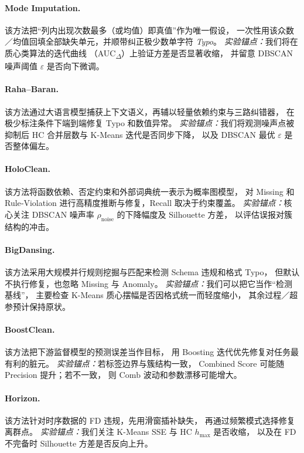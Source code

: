 \documentclass[10pt]{article} %
\numberwithin{equation}{section}
\begin{document}
\paragraph{Mode Imputation.}
该方法把“列内出现次数最多（或均值）即真值”作为唯一假设，  
一次性用该众数／均值回填全部缺失单元，并顺带纠正极少数单字符 \textit{Typo}。  
\emph{实验锚点：}我们将在质心类算法的迭代曲线
（AUC\textsubscript{$\Delta$}）上验证方差是否显著收缩，
并留意 DBSCAN 噪声阈值 $\varepsilon$ 是否向下微调。

\paragraph{Raha--Baran\cite{10.14778/3407790.3407801}.}
该方法通过大语言模型捕获上下文语义，再辅以轻量依赖约束与三路纠错器，
在极少标注条件下端到端修复 Typo 和数值异常。  
\emph{实验锚点：}我们将观测噪声点被抑制后
HC 合并层数与 K-Means 迭代是否同步下降，
以及 DBSCAN 最优 $\varepsilon$ 是否整体偏左。

\paragraph{HoloClean\cite{Rekatsinas2017}.}
该方法将函数依赖、否定约束和外部词典统一表示为概率图模型，
对 Missing 和 Rule‐Violation 进行高精度推断与修复，Recall 取决于约束覆盖。  
\emph{实验锚点：}核心关注 DBSCAN 噪声率
$\rho_{\text{noise}}$ 的下降幅度及 Silhouette 方差，
以评估误报对簇结构的冲击。

\paragraph{BigDansing\cite{Khayyat2015BigDansing}.}
该方法采用大规模并行规则挖掘与匹配来检测 Schema 违规和格式 Typo，
但默认不执行修复，也忽略 Missing 与 Anomaly。  
\emph{实验锚点：}我们可以把它当作“检测基线”，
主要检查 K-Means 质心摆幅是否因格式统一而轻度缩小，
其余过程／超参预计保持原状。

\paragraph{BoostClean\cite{Krishnan2017BoostClean}.}
该方法把下游监督模型的预测误差当作目标，
用 Boosting 迭代优先修复对任务最有利的脏元。  
\emph{实验锚点：}若标签边界与簇结构一致，
Combined Score 可能随 Precision 提升；若不一致，
则 $\mathrm{Comb}$ 波动和参数漂移可能增大。

\paragraph{Horizon\cite{10.14778/3476249.3476301}.}
该方法针对时序数据的 FD 违规，先用滑窗插补缺失，
再通过频繁模式选择修复离群点。  
\emph{实验锚点：}我们关注 K-Means SSE 与 HC $h_{\max}$ 是否收缩，
以及在 FD 不完备时 Silhouette 方差是否反向上升。
\end{document}
